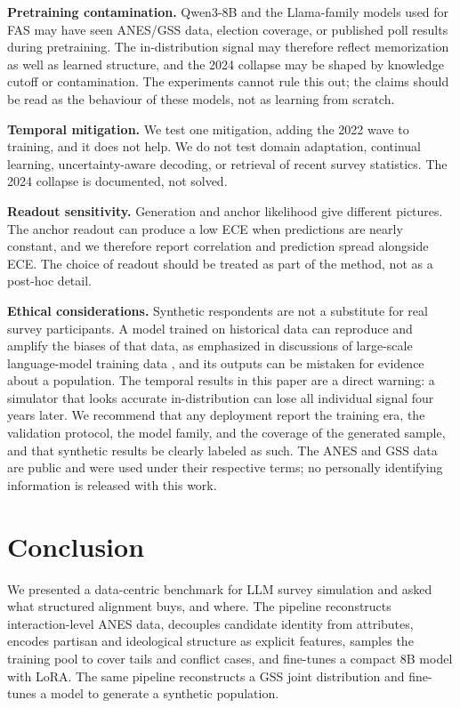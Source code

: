 \textbf{Pretraining contamination.} Qwen3-8B and the Llama-family models
used for FAS may have seen ANES/GSS data, election coverage, or
published poll results during pretraining. The in-distribution signal
may therefore reflect memorization as well as learned structure, and the
2024 collapse may be shaped by knowledge cutoff or contamination. The
experiments cannot rule this out; the claims should be read as the
behaviour of these models, not as learning from scratch.

\textbf{Temporal mitigation.} We test one mitigation, adding the 2022
wave to training, and it does not help. We do not test domain
adaptation, continual learning, uncertainty-aware decoding, or retrieval
of recent survey statistics. The 2024 collapse is documented, not
solved.

\textbf{Readout sensitivity.} Generation and anchor likelihood give
different pictures. The anchor readout can produce a low ECE when
predictions are nearly constant, and we therefore report correlation and
prediction spread alongside ECE. The choice of readout should be treated
as part of the method, not as a post-hoc detail.

\textbf{Ethical considerations.} Synthetic respondents are not a
substitute for real survey participants. A model trained on historical
data can reproduce and amplify the biases of that data, as emphasized in
discussions of large-scale language-model training data
\citep{bender2021stochastic}, and its outputs can be mistaken for
evidence about a population. The temporal results in this paper are a
direct warning: a simulator that looks accurate in-distribution can lose
all individual signal four years later. We recommend that any deployment
report the training era, the validation protocol, the model family, and
the coverage of the generated sample, and that synthetic results be
clearly labeled as such. The ANES and GSS data are public and were used
under their respective terms; no personally identifying information is
released with this work.

\section{Conclusion}\label{conclusion}

We presented a data-centric benchmark for LLM survey simulation and
asked what structured alignment buys, and where. The pipeline
reconstructs interaction-level ANES data, decouples candidate identity
from attributes, encodes partisan and ideological structure as explicit
features, samples the training pool to cover tails and conflict cases,
and fine-tunes a compact 8B model with LoRA. The same pipeline
reconstructs a GSS joint distribution and fine-tunes a model to generate
a synthetic population.

